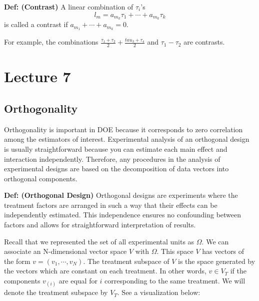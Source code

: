\documentclass{tufte-book}
\begin{document}
\textbf{Def: (Contrast)} A linear combination of $\tau_{i}$'s \[l_{m} = a_{m_{k}}\tau_{1} + \cdots + a_{m_{k}} \tau_{k}\]is 
called a contrast if $a_{m_1} + \cdots + a_{m_{k}} = 0$. \newline

For example, the combinations $\frac{\tau_{1} + \tau_{2}}{2} + \frac{tau_{3} + \tau_{4}}{2}$ and $\tau_{1} - \tau_{2}$ are 
contrasts. 

\section{Lecture 7}

\subsection{Orthogonality}

Orthogonality is important in DOE because it corresponds to zero correlation among the estimators of interest. 
Experimental analysis of an orthogonal design is usually straightforward because you can estimate each main effect 
and interaction independently. Therefore, any procedures in the analysis of experimental designs are based on the 
decomposition of data vectors into orthogonal components. \newline

\textbf{Def: (Orthogonal Design)} Orthogonal designs are experiments where the treatment factors are arranged in such a way 
that their effects can be independently estimated. This independence ensures no confounding between factors and allows for 
straightforward interpretation of results. \newline

Recall that we represented the set of all experimental units as $\Omega$. We can associate an N-dimensional vector space $V$ 
with $\Omega$. This space $V$ has vectors of the form $v = (v_{1}, \cdots, v_{N})$. The treatment subspace of $V$ is the space 
generated by the vectors which are constant on each treatment. In other words, $v \in V_{T}$ if the components $v_{(i)}$ are 
equal for $i$ corresponding to the same treatment. We will denote the treatment subspace by $V_{T}$. See a visualization below: \newline

\end{document}
